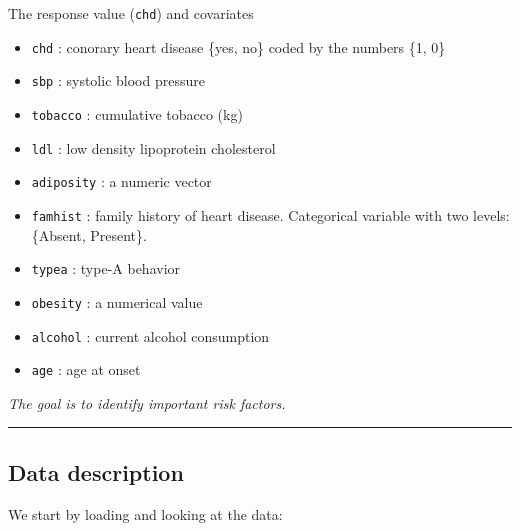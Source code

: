 \documentclass[
]{article}
\newenvironment{Shaded}{\begin{snugshade}}{\end{snugshade}}
\newcommand{\DataTypeTok}[1]{\textcolor[rgb]{0.13,0.29,0.53}{#1}}
\newcommand{\DecValTok}[1]{\textcolor[rgb]{0.00,0.00,0.81}{#1}}
\newcommand{\KeywordTok}[1]{\textcolor[rgb]{0.13,0.29,0.53}{\textbf{#1}}}
\newcommand{\NormalTok}[1]{#1}
\newcommand{\OperatorTok}[1]{\textcolor[rgb]{0.81,0.36,0.00}{\textbf{#1}}}
\newcommand{\StringTok}[1]{\textcolor[rgb]{0.31,0.60,0.02}{#1}}
\providecommand{\tightlist}{%
  \setlength{\itemsep}{0pt}\setlength{\parskip}{0pt}}
\begin{document}
The response value (\texttt{chd}) and covariates

\begin{itemize}
\tightlist
\item
  \texttt{chd} : conorary heart disease \{yes, no\} coded by the numbers
  \{1, 0\}
\item
  \texttt{sbp} : systolic blood pressure\\
\item
  \texttt{tobacco} : cumulative tobacco (kg)\\
\item
  \texttt{ldl} : low density lipoprotein cholesterol
\item
  \texttt{adiposity} : a numeric vector
\item
  \texttt{famhist} : family history of heart disease. Categorical
  variable with two levels: \{Absent, Present\}.
\item
  \texttt{typea} : type-A behavior
\item
  \texttt{obesity} : a numerical value
\item
  \texttt{alcohol} : current alcohol consumption
\item
  \texttt{age} : age at onset
\end{itemize}

\emph{The goal is to identify important risk factors.}

\begin{center}\rule{0.5\linewidth}{0.5pt}\end{center}

\hypertarget{data-description}{%
\subsection{Data description}\label{data-description}}

We start by loading and looking at the data:

\begin{Shaded}
\end{Shaded}
\end{document}
